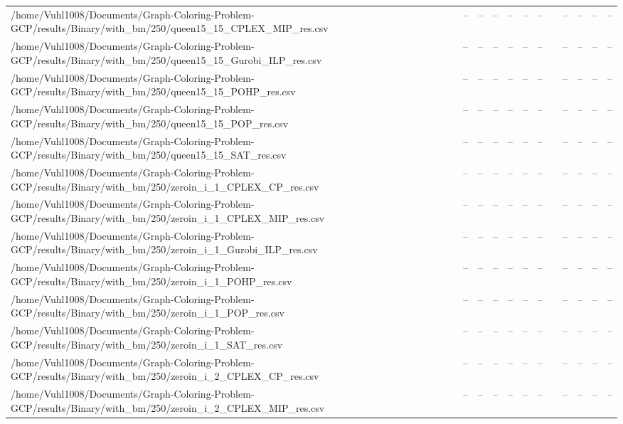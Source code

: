 \begin{table}[htbp]
\begin{tabular}{llllllllllll}
/home/Vuhl1008/Documents/Graph-Coloring-Problem-GCP/results/Binary/with\_bm/250/queen15\_15\_CPLEX\_MIP\_res.csv & -- & -- & -- & -- & -- & -- & {} & -- & -- & -- & -- \\
/home/Vuhl1008/Documents/Graph-Coloring-Problem-GCP/results/Binary/with\_bm/250/queen15\_15\_Gurobi\_ILP\_res.csv & -- & -- & -- & -- & -- & -- & {} & -- & -- & -- & -- \\
/home/Vuhl1008/Documents/Graph-Coloring-Problem-GCP/results/Binary/with\_bm/250/queen15\_15\_POHP\_res.csv & -- & -- & -- & -- & -- & -- & {} & -- & -- & -- & -- \\
/home/Vuhl1008/Documents/Graph-Coloring-Problem-GCP/results/Binary/with\_bm/250/queen15\_15\_POP\_res.csv & -- & -- & -- & -- & -- & -- & {} & -- & -- & -- & -- \\
/home/Vuhl1008/Documents/Graph-Coloring-Problem-GCP/results/Binary/with\_bm/250/queen15\_15\_SAT\_res.csv & -- & -- & -- & -- & -- & -- & {} & -- & -- & -- & -- \\
/home/Vuhl1008/Documents/Graph-Coloring-Problem-GCP/results/Binary/with\_bm/250/zeroin\_i\_1\_CPLEX\_CP\_res.csv & -- & -- & -- & -- & -- & -- & {} & -- & -- & -- & -- \\
/home/Vuhl1008/Documents/Graph-Coloring-Problem-GCP/results/Binary/with\_bm/250/zeroin\_i\_1\_CPLEX\_MIP\_res.csv & -- & -- & -- & -- & -- & -- & {} & -- & -- & -- & -- \\
/home/Vuhl1008/Documents/Graph-Coloring-Problem-GCP/results/Binary/with\_bm/250/zeroin\_i\_1\_Gurobi\_ILP\_res.csv & -- & -- & -- & -- & -- & -- & {} & -- & -- & -- & -- \\
/home/Vuhl1008/Documents/Graph-Coloring-Problem-GCP/results/Binary/with\_bm/250/zeroin\_i\_1\_POHP\_res.csv & -- & -- & -- & -- & -- & -- & {} & -- & -- & -- & -- \\
/home/Vuhl1008/Documents/Graph-Coloring-Problem-GCP/results/Binary/with\_bm/250/zeroin\_i\_1\_POP\_res.csv & -- & -- & -- & -- & -- & -- & {} & -- & -- & -- & -- \\
/home/Vuhl1008/Documents/Graph-Coloring-Problem-GCP/results/Binary/with\_bm/250/zeroin\_i\_1\_SAT\_res.csv & -- & -- & -- & -- & -- & -- & {} & -- & -- & -- & -- \\
/home/Vuhl1008/Documents/Graph-Coloring-Problem-GCP/results/Binary/with\_bm/250/zeroin\_i\_2\_CPLEX\_CP\_res.csv & -- & -- & -- & -- & -- & -- & {} & -- & -- & -- & -- \\
/home/Vuhl1008/Documents/Graph-Coloring-Problem-GCP/results/Binary/with\_bm/250/zeroin\_i\_2\_CPLEX\_MIP\_res.csv & -- & -- & -- & -- & -- & -- & {} & -- & -- & -- & -- \\

\end{tabular}
\end{table}
